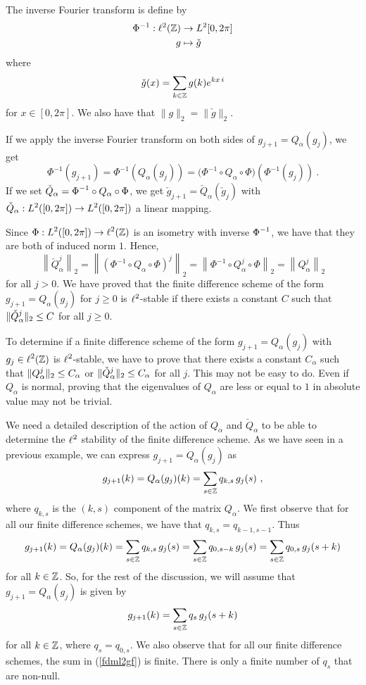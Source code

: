 The inverse Fourier transform is define by
\begin{align*}
\Phi^{-1} : \ell^2(\mathbb{Z}) & \to L^2{[0,2\pi]} \\
g & \mapsto \check{g}
\end{align*}
where
\[
  \check{g}(x) = \sum_{k\in \mathbb{Z}} g(k) e^{k x\, i}
\]
for $x \in [0,2\pi]$.  We also have that $\|g\|_2 = \|\check{g}\|_2$.

If we apply the inverse Fourier transform on both sides of
$g_{j+1} = Q_\alpha(g_j)$, we get
\[
\Phi^{-1}(g_{j+1}) = \Phi^{-1}(Q_\alpha(g_j))
= \big(\Phi^{-1}\circ Q_\alpha \circ\Phi\big) (\Phi^{-1}(g_j)) \ .
\]
If we set
$\displaystyle \check{Q}_\alpha = \Phi^{-1}\circ Q_\alpha \circ \Phi$, we get
$\check{g}_{j+1} = \check{Q}_\alpha\left(\check{g}_j\right)$ with
$\displaystyle \check{Q}_\alpha: L^2([0,2\pi]) \to L^2([0,2\pi])$ a
linear mapping.

Since $\displaystyle \Phi : L^2([0,2\pi]) \to \ell^2(\mathbb{Z})$ is an isometry with
inverse $\displaystyle \Phi^{-1}$, we have that they are both of
induced norm $1$.  Hence,
\[
\left\|\check{Q}_\alpha^j\right\|_2
= \left\|\left(\Phi^{-1}\circ Q_\alpha \circ \Phi\right)^j\right\|_2
= \left\|\Phi^{-1}\circ Q_\alpha^j \circ \Phi\right\|_2
= \left\|Q_\alpha^j \right\|_2
\]
for all $j>0$.  We have proved that the finite difference scheme of
the form $g_{j+1} = Q_\alpha(g_j)$ for $j\geq 0$ is $\displaystyle \ell^2$-stable
if there exists a constant $C$ such that
$\displaystyle \|\check{Q}_\alpha^j\|_2 \leq C$
for all $j\geq 0$.

To determine if a finite difference scheme of the form
$g_{j+1} = Q_\alpha(g_j)$ with $\displaystyle g_j \in \ell^2(\mathbb{Z})$
is $\displaystyle \ell^2$-stable,
we have to prove that there exists a constant $C_\alpha$ such that
$\displaystyle \|Q_\alpha^j \|_2\leq C_\alpha$ or
$\displaystyle \|\check{Q}_\alpha^j \|_2\leq C_\alpha$ for all $j$.
This may not be easy to do.   Even if $Q_\alpha$ is normal, proving
that the eigenvalues of $Q_\alpha$ are less or equal to $1$ in absolute
value may not be trivial.

We need a detailed description of the action of $Q_\alpha$ and
$\check{Q}_\alpha$ to be able to determine the
$\displaystyle \ell^2$ stability of
the finite difference scheme.  As we have seen in a previous example,
we can express $g_{j+1} = Q_\alpha(g_j)$ as
\[
g_{j+1}(k) = Q_\alpha(g_j)(k) = \sum_{s\in \mathbb{Z}} q_{k,s}\, g_j(s) \ ,
\]
where $q_{k,s}$ is the $(k,s)$ component of the matrix $Q_\alpha$.
We first observe that for all our finite difference schemes, we have
that $q_{k,s} = q_{k-1,s-1}$.  Thus
\[
g_{j+1}(k) = Q_\alpha(g_j)(k) = \sum_{s\in \mathbb{Z}} q_{k,s}\, g_j(s)
= \sum_{s\in \mathbb{Z}} q_{0,s-k}\, g_j(s)
= \sum_{s\in \mathbb{Z}} q_{0,s}\, g_j(s+k)
\]
for all $k \in \mathbb{Z}$.  So, for the rest of the discussion, we will
assume that $g_{j+1} = Q_\alpha(g_j)$ is given by
\begin{equation} \label{fdml2gf}
g_{j+1}(k) = \sum_{s\in \mathbb{Z}} q_s\, g_j(s+k)
\end{equation}
for all $k \in \mathbb{Z}$, where $q_s = q_{0,s}$.  We also observe that for
all our finite difference schemes, the sum in (\ref{fdml2gf}) is
finite.   There is only a finite number of $q_s$ that are non-null.

